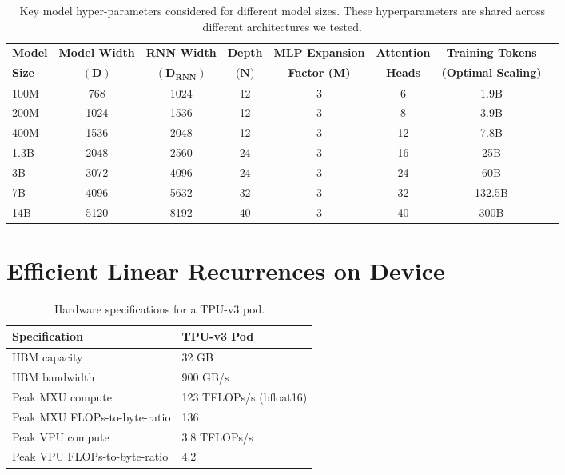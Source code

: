 \documentclass[11pt, a4paper, logo, onecolumn]{googledeepmind}
\theoremstyle{definition}
\begin{document}
\begin{table}[htbp!]
\caption{Key model hyper-parameters considered for different model sizes. These hyperparameters are shared across different architectures we tested.}
\small
\centering
\begin{tabular}{lccccccl}
\toprule
\textbf{Model} & \textbf{Model Width} & \textbf{RNN Width} & \textbf{Depth} & \textbf{MLP Expansion} & \textbf{Attention} & \textbf{Training Tokens} \\
\textbf{Size} & $\bm{(D)}$ & $\bm{(D_{RNN})}$ & ($\bm{N}$) & \textbf{Factor ($\bm{M}$)} & \textbf{Heads}  & \textbf{(Optimal Scaling)} \\ \midrule
100M & 768 & 1024 & 12 & 3 & 6  & 1.9B \\
\rowcolor{tablerowcolor} 200M & 1024 & 1536 & 12 & 3 & 8  & 3.9B \\
400M & 1536 & 2048 & 12 & 3 & 12  & 7.8B \\
\rowcolor{tablerowcolor} 1.3B & 2048 & 2560 & 24 & 3 & 16  & 25B \\
3B & 3072 & 4096 & 24 & 3 & 24 & 60B \\
\rowcolor{tablerowcolor} 7B & 4096 & 5632 & 32 & 3 & 32  & 132.5B \\
14B & 5120 & 8192 & 40 & 3 & 40  & 300B
\end{tabular}
\label{tab:hypers}
\end{table}
















\section{Efficient Linear Recurrences on Device}
\label{appendix:efficient_device}


\begin{table}[htbp!]
\centering
\begin{tabular}{l l} 
\toprule
\textbf{Specification} & \textbf{TPU-v3 Pod} \\
\midrule
HBM capacity & 32 GB \\
\rowcolor{tablerowcolor} HBM bandwidth & 900 GB/s \\
Peak MXU compute & 123 TFLOPs/s (bfloat16) \\ 
\rowcolor{tablerowcolor} Peak MXU FLOPs-to-byte-ratio & 136 \\
Peak VPU compute & 3.8 TFLOPs/s \\ 
\rowcolor{tablerowcolor} Peak VPU FLOPs-to-byte-ratio & 4.2 \\
\end{tabular}
\caption{Hardware specifications for a TPU-v3 pod.}
\label{appendix:tpu_specs}
\end{table}
\end{document}
